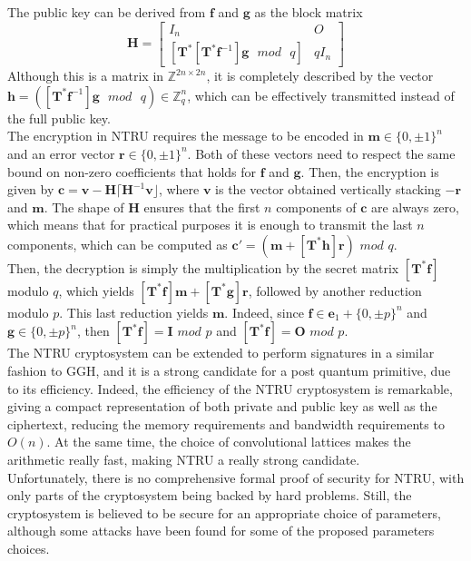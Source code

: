 The public key can be derived from $\mathbf{f}$ and $\mathbf{g}$  as the block matrix
\begin{equation*}
\mathbf{H}=
\left[\begin{array}{c|c}
I_n & O \\
\hline
[\mathbf{T}^*[\mathbf{T}^*\mathbf{f}^{-1}]\mathbf{g}\text{ }mod\text{ }q] & qI_n
\end{array}\right]
\end{equation*}
Although this is a matrix in $\mathbb{Z}^{2n\times 2n}$, it is completely described by the vector \mbox{$\mathbf{h}=([\mathbf{T}^*\mathbf{f}^{-1}]\mathbf{g}\text{ }mod\text{ }q)\in\mathbb{Z}_q^n$}, which can be effectively transmitted instead of the full public key.\\
The encryption in NTRU requires the message to be encoded in $\mathbf{m}\in\{0,\pm1\}^n$ and an error vector $\mathbf{r}\in\{0,\pm1\}^n$. Both of these vectors need to respect the same bound on non-zero coefficients that holds for $\mathbf{f}$ and $\mathbf{g}$. Then, the encryption is given by $\mathbf{c}=\mathbf{v}-\mathbf{H}\lceil\mathbf{H}^{-1}\mathbf{v}\rfloor$, where $\mathbf{v}$ is the vector obtained vertically stacking $-\mathbf{r}$ and $\mathbf{m}$. The shape of $\mathbf{H}$ ensures that the first $n$ components of $\mathbf{c}$ are always zero, which means that for practical purposes it is enough to transmit the last $n$ components, which can be computed as $\mathbf{c}'=(\mathbf{m}+[\mathbf{T}^*\mathbf{h}]\mathbf{r})$ $mod$ $q$.\\
Then, the decryption is simply the multiplication by the secret matrix $[\mathbf{T}^*\mathbf{f}]$ modulo $q$, which yields $[\mathbf{T}^*\mathbf{f}]\mathbf{m} + [\mathbf{T}^*\mathbf{g}]\mathbf{r}$, followed by another reduction modulo $p$. This last reduction yields $\mathbf{m}$. Indeed, since $\mathbf{f}\in\mathbf{e}_1+\{0,\pm p\}^n$ and $\mathbf{g}\in\{0,\pm p\}^n$, then $[\mathbf{T}^*\mathbf{f}]=\mathbf{I}$ $mod$ $p$ and $[\mathbf{T}^*\mathbf{f}]=\mathbf{O}$ $mod$ $p$.\\
The NTRU cryptosystem can be extended to perform signatures in a similar fashion to GGH, and it is a strong candidate for a post quantum primitive, due to its efficiency. Indeed, the efficiency of the NTRU cryptosystem is remarkable, giving a compact representation of both private and public key as well as the ciphertext, reducing the memory requirements and bandwidth requirements to $O(n)$. At the same time, the choice of convolutional lattices makes the arithmetic really fast, making NTRU a really strong candidate.\\
Unfortunately, there is no comprehensive formal proof of security for NTRU, with only parts of the cryptosystem being backed by hard problems. Still, the cryptosystem is believed to be secure for an appropriate choice of parameters, although some attacks have been found for some of the proposed parameters choices.

